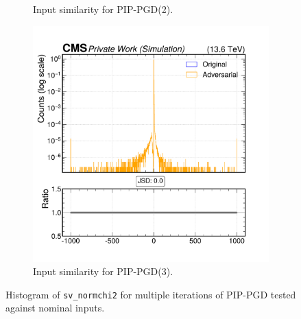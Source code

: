 \begin{figure}[h]
\begin{subfigure}[t]{0.32\textwidth}
    \caption*{Input similarity for PIP-PGD(2).}
  \end{subfigure}\hfill
  \begin{subfigure}[t]{0.32\textwidth}
    \includegraphics[width=\linewidth]{media/output/features/compare/combined_it_3/cmp_vtx_arr_sv_normchi2.pdf}
    \caption*{Input similarity for PIP-PGD(3).}
  \end{subfigure}

  \caption*{Histogram of \texttt{sv\_normchi2} for multiple iterations of PIP-PGD tested against nominal inputs.}
  \label{fig:combined_input_sv_normchi2}
\end{figure}

